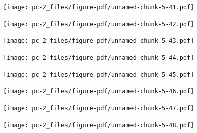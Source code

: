 \documentclass[
  letterpaper,
  DIV=11,
  numbers=noendperiod]{scrreprt}
\begin{document}
\begin{figure}[H]

{\centering \texttt{[image: pc-2\_files/figure-pdf/unnamed-chunk-5-41.pdf]}

}

\end{figure}

\begin{figure}[H]

{\centering \texttt{[image: pc-2\_files/figure-pdf/unnamed-chunk-5-42.pdf]}

}

\end{figure}

\begin{figure}[H]

{\centering \texttt{[image: pc-2\_files/figure-pdf/unnamed-chunk-5-43.pdf]}

}

\end{figure}

\begin{figure}[H]

{\centering \texttt{[image: pc-2\_files/figure-pdf/unnamed-chunk-5-44.pdf]}

}

\end{figure}

\begin{figure}[H]

{\centering \texttt{[image: pc-2\_files/figure-pdf/unnamed-chunk-5-45.pdf]}

}

\end{figure}

\begin{figure}[H]

{\centering \texttt{[image: pc-2\_files/figure-pdf/unnamed-chunk-5-46.pdf]}

}

\end{figure}

\begin{figure}[H]

{\centering \texttt{[image: pc-2\_files/figure-pdf/unnamed-chunk-5-47.pdf]}

}

\end{figure}

\begin{figure}[H]

{\centering \texttt{[image: pc-2\_files/figure-pdf/unnamed-chunk-5-48.pdf]}

}

\end{figure}
\end{document}
